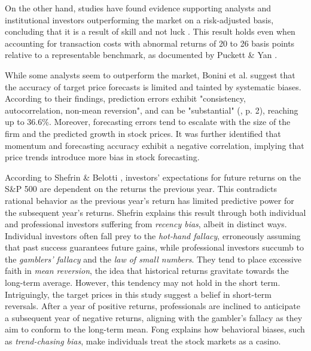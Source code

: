 On the other hand, studies have found evidence supporting analysts and institutional investors outperforming the market on a risk-adjusted basis, concluding that it is a result of skill and not luck \parencite{bhootra2015mutual}. This result holds even when accounting for transaction costs with abnormal returns of 20 to 26 basis points relative to a representable benchmark, as documented by Puckett \& Yan \parencite*{puckett2011interim}. 

While some analysts seem to outperform the market, Bonini et al. \parencite*{bonini2010target} suggest that the accuracy of target price forecasts is limited and tainted by systematic biases. According to their findings, prediction errors exhibit "consistency, autocorrelation, non-mean reversion", and can be "substantial" (\cite{bonini2010target}, p. 2), reaching up to 36.6\%. Moreover, forecasting errors tend to escalate with the size of the firm and the predicted growth in stock prices. It was further identified that momentum and forecasting accuracy exhibit a negative correlation, implying that price trends introduce more bias in stock forecasting. %

According to Shefrin \& Belotti \parencite*{shefrin2007behavioral}, investors' expectations for future returns on the S\&P 500 are dependent on the returns the previous year. This contradicts rational behavior as the previous year's return has limited predictive power for the subsequent year's returns. Shefrin explains this result through both individual and professional investors suffering from \textit{recency bias}, albeit in distinct ways. Individual investors often fall prey to the \textit{hot-hand fallacy}, erroneously assuming that past success guarantees future gains, while professional investors succumb to the \textit{gamblers' fallacy} and the \textit{law of small numbers}. They tend to place excessive faith in \textit{mean reversion}, the idea that historical returns gravitate towards the long-term average. However, this tendency may not hold in the short term. Intriguingly, the target prices in this study suggest a belief in short-term reversals. After a year of positive returns, professionals are inclined to anticipate a subsequent year of negative returns, aligning with the gambler's fallacy as they aim to conform to the long-term mean. Fong \parencite*{fong2014trend} explains how behavioral biases, such as \textit{trend-chasing bias}, make individuals treat the stock markets as a casino. 

